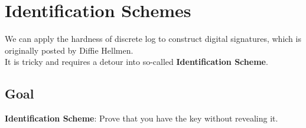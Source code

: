 \documentclass{scribe}
\begin{document}
\maketitle


\section{Identification Schemes}
We can apply the hardness of discrete log to construct digital signatures,
 which is originally posted by Diffie Hellmen.
\\
It is tricky and requires a detour into so-called \textbf{Identification Scheme}.
\\
\subsection{Goal}
\textbf{Identification Scheme}: Prove that you have the key without revealing it.
\end{document}
